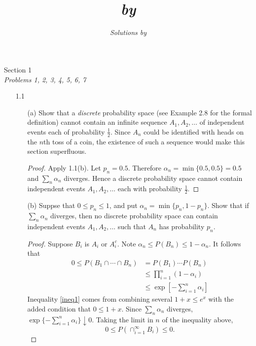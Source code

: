 \documentclass[letterpaper, 12pt]{article}
\title{\textbook\\\normalsize\textsl{by} \textsc{\textauthor}}
\author{\small\textsl{Solutions by}\\\large\myname}
\date{\thedate}
\newcommand{\problemlist}{ 
\begin{center}
\textsf{\Large \assignment}\\
\textit{\textsf{\problemset}}
\end{center}
\bigskip
}
\newcommand{\pion}{\prod_{i=1}^n}
\newcommand{\sion}{\sum_{i=1}^n}
\newcommand{\assignment}{Section 1}
\newcommand{\problemset}{Problems 1, 2, 3, 4, 5, 6, 7}
\begin{document}
\maketitle

\bigskip

\problemlist

\begin{enumerate}
\item[1.1]
\begin{enumerate}
\item[(a)]
Show that a \textit{discrete} probability space (see Example 2.8 for the formal definition) cannot contain an infinite sequence $A_1, A_2, \dots$ of independent events each of probability $\frac{1}{2}$. Since $A_n$ could be identified with heads on the $n$th toss of a coin, the existence of such a sequence would make this section superfluous.

\begin{proof}
Apply 1.1(b). Let $p_n = 0.5$. Therefore $\alpha_n=\min\{0.5,0.5\} = 0.5$ and $\sum_n \alpha_n$ diverges. Hence a discrete probability space cannot contain independent events $A_1, A_2, \dots$ each with probability $\frac{1}{2}$. 
\end{proof}

\item[(b)]
Suppse that $0 \leq p_n \leq 1$, and put $\alpha_n = \min\{p_n, 1-p_n\}$. Show that if $\sum_n \alpha_n$ diverges, then no discrete probability space can contain independent events $A_1, A_2, \dots$ such that $A_n$ has probability $p_n$.

\begin{proof}
Suppose $B_i$ is $A_i$ or $A_i^c$. Note $\alpha_n \leq P(B_n) \leq 1-\alpha_n$. It follows that
\begin{align}
0 \leq P(B_1 \cap \cdots \cap B_n) &= P(B_1)\cdots P(B_n) \\
&\leq \pion (1 -\alpha_i) \\
&\leq \exp \left[ -\sion \alpha_i \right] 
\label{ineq1}
\end{align}
Inequality \eqref{ineq1} comes from combining several $1+x \leq e^x$ with the added condition that $0 \leq 1+x$. Since $\sum_n \alpha_n$ diverges, $\exp \{ -\sion \alpha_i \} \downarrow 0$.  Taking the limit in $n$ of the inequality above, 
\begin{equation}
0 \leq P\left( \cap_{i=1}^\infty B_i  \right) \leq 0.
\end{equation}


\end{proof}
\end{enumerate}
\end{enumerate}
\end{document}
